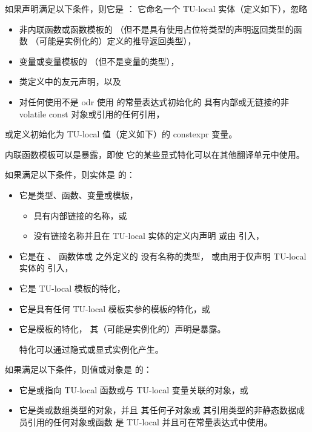 \pnum
如果声明满足以下条件，则它是 ：
它命名一个 TU-local 实体（定义如下），忽略
\begin{itemize}
\item
非内联函数或函数模板的 
（但不是具有使用占位符类型的声明返回类型的函数
（可能是实例化的）定义的推导返回类型），
\item
变量或变量模板的 
（但不是变量的类型），
\item
类定义中的友元声明，以及
\item
对任何使用不是 odr 使用 的常量表达式初始化的
具有内部或无链接的非 volatile const 对象或引用的任何引用，
\end{itemize}
或定义初始化为 TU-local 值（定义如下）的 constexpr 变量。
\begin{note}
内联函数模板可以是暴露，即使
它的某些显式特化可以在其他翻译单元中使用。
\end{note}

\pnum
如果满足以下条件，则实体是  的：
\begin{itemize}
\item
它是类型、函数、变量或模板，
\begin{itemize}
\item
具有内部链接的名称，或
\item
没有链接名称并且在
TU-local 实体的定义内声明
或由  引入，
\end{itemize}
\item
它是在 、
函数体或  之外定义的
没有名称的类型，
或由用于仅声明 TU-local 实体的  引入，
\item
它是 TU-local 模板的特化，
\item
它是具有任何 TU-local 模板实参的模板的特化，或
\item
它是模板的特化，
其（可能是实例化的）声明是暴露。
\begin{note}
特化可以通过隐式或显式实例化产生。
\end{note}
\end{itemize}

\pnum
如果满足以下条件，则值或对象是  的：
\begin{itemize}
\item
它是或指向
TU-local 函数或与 TU-local 变量关联的对象，或
\item
它是类或数组类型的对象，并且
其任何子对象或
其引用类型的非静态数据成员引用的任何对象或函数
是 TU-local 并且可在常量表达式中使用。
\end{itemize}

